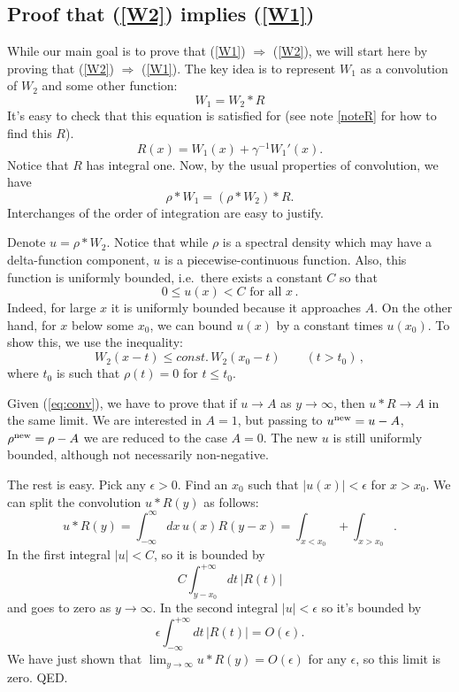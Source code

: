 \documentclass[12pt]{article}
\newcommand{\reef}[1]{(\ref{#1})}
\def\eps{\epsilon}
\newcommand{\beq}{\begin{equation}}
\newcommand{\eeq}{\end{equation}}
\def\le{\leqslant}
\def\eps{\epsilon}
\numberwithin{equation}{section}
\begin{document}
 

\subsection{Proof that \reef{W2} implies \reef{W1}}
\label{secW2W1}

While our main goal is to prove that \reef{W1} $\Rightarrow$ \reef{W2}, we will start here by proving that \reef{W2} $\Rightarrow$ \reef{W1}. The key idea is to represent $W_1$ as a convolution of $W_2$ and some other function:
\beq
W_1 = W_2*R 
\label{R}
\eeq
It's easy to check that this equation is satisfied for (see note \ref{noteR} for how to find this $R$).
\beq
\label{Rexpl}
R(x) = W_1(x) + \gamma^{-1} W_1'(x).
\eeq
Notice that $R$ has integral one. Now, by the usual properties of convolution, we have
\beq
\label{eq:conv}
\rho * W_1 = (\rho* W_2)*R.
\eeq  
Interchanges of the order of integration are easy to justify.

 Denote $u = \rho*W_2$. Notice that while $\rho$ is a spectral density which may have a delta-function component, $u$ is a piecewise-continuous function. Also, this function is uniformly bounded, i.e.~there exists a constant $C$ so that
\beq
0\le u(x) <C\text{ for all }x\,.
\eeq
Indeed, for large $x$ it is uniformly bounded because it approaches $A$. On the other hand, for $x$ below some $x_0$, we can bound $u(x)$ by a constant times $u(x_0)$. {To show this, we use the inequality:
\beq
\label{eq:const}
W_2(x-t)\le const.\, W_2(x_0-t)\qquad(t>t_0)\,,
\eeq
where $t_0$ is such that $\rho(t)=0$ for $t\le t_0$.}

Given \reef{eq:conv}, we have to prove that if $u\to A$ as $y\to\infty$, then $u*R\to A$ in the same limit. We are interested in $A=1$, but passing to $u^{\rm new}=u-A$, $\rho^{\rm new}=\rho-A$ we are reduced to the case $A=0$.
The new $u$ is still uniformly bounded, although not necessarily non-negative.

The rest is easy. Pick any $\eps>0$. Find an $x_0$ such that $|u(x)|<\eps$ for $x>x_0$. We can split the convolution $u*R(y)$ as follows:
\beq
u*R(y) = \int_{-\infty}^{\infty} dx\, u(x)R(y-x)=\int_{x<x_0}+\int_{x>x_0}.
\eeq 
In the first integral $|u|<C$, so it is bounded by 
\beq
C \int_{y-x_0}^{+\infty} dt\, |R(t)|
\eeq 
and goes to zero as $y\to\infty$. In the second integral $|u|<\eps$ so it's bounded by
\beq
\eps \int_{-\infty}^{+\infty} dt\, |R(t)| = O(\eps).
\eeq
We have just shown that $\lim_{y\to\infty} u*R(y)=O(\eps)$ for any $\eps$, so this limit is zero. QED.
\end{document}
